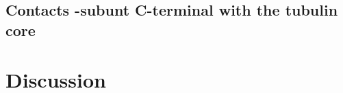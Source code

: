 \documentclass[a4paper]{article}
\begin{document}

\subsection{Contacts \beta-subunt C-terminal with the tubulin core}


\section{Discussion}

%
%
%
\end{document}
